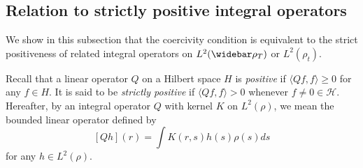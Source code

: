 \documentclass[]{elsarticle}
\newcommand{\wbar}\widebar
\newcommand{\hypspace}{\mathcal{H}}
\newcommand{\FL}[1]{\textcolor{blue}{{#1}}}
\numberwithin{equation}{section}
\numberwithin{theorem}{section}
\begin{document}
\subsection{Relation to strictly positive integral operators}
\label{sec:operator}
We show in this subsection that the coercivity condition is equivalent to the strict positiveness of related integral operators on $L^2(\wbar\rho_T)$ or $L^2(\rho_t)$. 




Recall that a linear operator $Q$ on a Hilbert space $H$ is \emph{positive} if $\langle Q f,f\rangle \geq 0$ for any $f\in H$. It is said to be \emph{strictly positive} if  $\langle Q f,f\rangle> 0$ whenever $f\neq 0 \in \hypspace$. %
Hereafter, by an integral operator $Q$ with kernel $K$ on $L^2(\rho)$, we mean the bounded linear operator defined by 
\[
[Qh](r) = \int K(r,s) h(s) \rho(s)ds 
\] 
for any $h\in L^2(\rho)$. 
\end{document}
